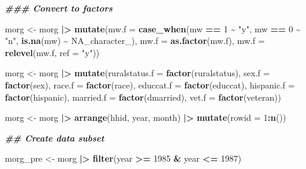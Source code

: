 \documentclass[
  ignorenonframetext,
]{beamer}
\newenvironment{Shaded}{\begin{snugshade}}{\end{snugshade}}
\newcommand{\AttributeTok}[1]{\textcolor[rgb]{0.13,0.29,0.53}{#1}}
\newcommand{\ConstantTok}[1]{\textcolor[rgb]{0.56,0.35,0.01}{#1}}
\newcommand{\DecValTok}[1]{\textcolor[rgb]{0.00,0.00,0.81}{#1}}
\newcommand{\DocumentationTok}[1]{\textcolor[rgb]{0.56,0.35,0.01}{\textbf{\textit{#1}}}}
\newcommand{\FunctionTok}[1]{\textcolor[rgb]{0.13,0.29,0.53}{\textbf{#1}}}
\newcommand{\NormalTok}[1]{#1}
\newcommand{\OtherTok}[1]{\textcolor[rgb]{0.56,0.35,0.01}{#1}}
\newcommand{\SpecialCharTok}[1]{\textcolor[rgb]{0.81,0.36,0.00}{\textbf{#1}}}
\newcommand{\StringTok}[1]{\textcolor[rgb]{0.31,0.60,0.02}{#1}}
\begin{document}
\begin{frame}[fragile]
\tiny

\begin{Shaded}
\begin{Highlighting}[]
\DocumentationTok{\#\#\# Convert to factors}

\NormalTok{morg }\OtherTok{\textless{}{-}}\NormalTok{ morg }\SpecialCharTok{|\textgreater{}}
  \FunctionTok{mutate}\NormalTok{(}\AttributeTok{mw.f =} \FunctionTok{case\_when}\NormalTok{(mw }\SpecialCharTok{==} \DecValTok{1} \SpecialCharTok{\textasciitilde{}} \StringTok{"y"}\NormalTok{,}
\NormalTok{                          mw }\SpecialCharTok{==} \DecValTok{0} \SpecialCharTok{\textasciitilde{}} \StringTok{"n"}\NormalTok{,}
                          \FunctionTok{is.na}\NormalTok{(mw) }\SpecialCharTok{\textasciitilde{}} \ConstantTok{NA\_character\_}\NormalTok{),}
         \AttributeTok{mw.f =} \FunctionTok{as.factor}\NormalTok{(mw.f),}
         \AttributeTok{mw.f =} \FunctionTok{relevel}\NormalTok{(mw.f, }\AttributeTok{ref =} \StringTok{"y"}\NormalTok{))}

\NormalTok{morg }\OtherTok{\textless{}{-}}\NormalTok{ morg }\SpecialCharTok{|\textgreater{}}
  \FunctionTok{mutate}\NormalTok{(}\AttributeTok{ruralstatus.f =} \FunctionTok{factor}\NormalTok{(ruralstatus),}
         \AttributeTok{sex.f =} \FunctionTok{factor}\NormalTok{(sex),}
         \AttributeTok{race.f =} \FunctionTok{factor}\NormalTok{(race),}
         \AttributeTok{educcat.f =} \FunctionTok{factor}\NormalTok{(educcat),}
         \AttributeTok{hispanic.f =} \FunctionTok{factor}\NormalTok{(hispanic),}
         \AttributeTok{married.f =} \FunctionTok{factor}\NormalTok{(dmarried),}
         \AttributeTok{vet.f =} \FunctionTok{factor}\NormalTok{(veteran))}

\NormalTok{morg }\OtherTok{\textless{}{-}}\NormalTok{ morg }\SpecialCharTok{|\textgreater{}}
  \FunctionTok{arrange}\NormalTok{(hhid, year, month) }\SpecialCharTok{|\textgreater{}}
  \FunctionTok{mutate}\NormalTok{(}\AttributeTok{rowid =} \DecValTok{1}\SpecialCharTok{:}\FunctionTok{n}\NormalTok{())}

\DocumentationTok{\#\# Create data subset}

\NormalTok{morg\_pre }\OtherTok{\textless{}{-}}\NormalTok{  morg }\SpecialCharTok{|\textgreater{}}
  \FunctionTok{filter}\NormalTok{(year }\SpecialCharTok{\textgreater{}=} \DecValTok{1985} \SpecialCharTok{\&}\NormalTok{ year }\SpecialCharTok{\textless{}=} \DecValTok{1987}\NormalTok{)}
\end{Highlighting}
\end{Shaded}
\end{frame}
\end{document}
